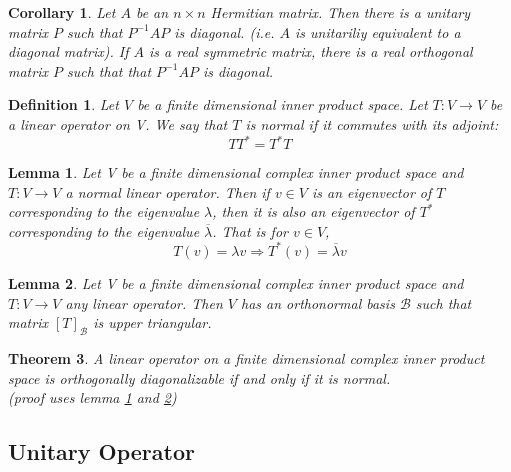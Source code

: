 \documentclass{article}
\newtheorem{theorem}{Theorem}[section]
\newtheorem{definition}{Definition}[section]
\newtheorem{corollary}{Corollary}[theorem]
\newtheorem{lemma}[theorem]{Lemma}
\numberwithin{theorem}{subsection} %
\numberwithin{definition}{subsection} %
\numberwithin{proposition}{subsection} %
\begin{document}
\begin{corollary}
    Let $A$ be an $n \times n$ Hermitian matrix. Then there is a unitary matrix $P$ such
    that $P^{-1}AP$ is diagonal. (i.e. $A$ is unitariliy equivalent to a diagonal matrix).
    If $A$ is a real symmetric matrix, there is a real orthogonal matrix $P$ such that 
    that $P^{-1}AP$ is diagonal.
\end{corollary}

\begin{definition}
    Let $V$ be a finite dimensional inner product space. Let $T:V \rightarrow V$ be
    a linear operator on V. We say that $T$ is normal if it commutes with its adjoint: 
    \begin{equation*}
        TT^* = T^*T
    \end{equation*}
\end{definition}

\begin{lemma}\label{lem2}
    Let V be a finite dimensional complex inner product space and $T:V\rightarrow V$
    a normal linear operator. Then if $v \in V$ is an eigenvector of $T$ corresponding to
    the eigenvalue $\lambda$, then it is also an eigenvector of $T^*$ corresponding to the
    eigenvalue $\overline{\lambda}$. That is for $v \in V$,
    \begin{equation*}
        T(v) = \lambda v \Rightarrow T^*(v) = \overline{\lambda} v
    \end{equation*}
\end{lemma}

\begin{lemma}\label{lem3}
    Let V be a finite dimensional complex inner product space and $T:V\rightarrow V$
    any linear operator. Then $V$ has an orthonormal basis $\mathcal{B}$ such that matrix
    $[T]_\mathcal{B}$ is upper triangular. 
\end{lemma}

\begin{theorem}
    A linear operator on a finite dimensional complex inner product space is orthogonally
    diagonalizable if and only if it is normal. \\
    (proof uses lemma \ref{lem2} and \ref{lem3})
\end{theorem}
        

\subsection{Unitary Operator}
\end{document}
